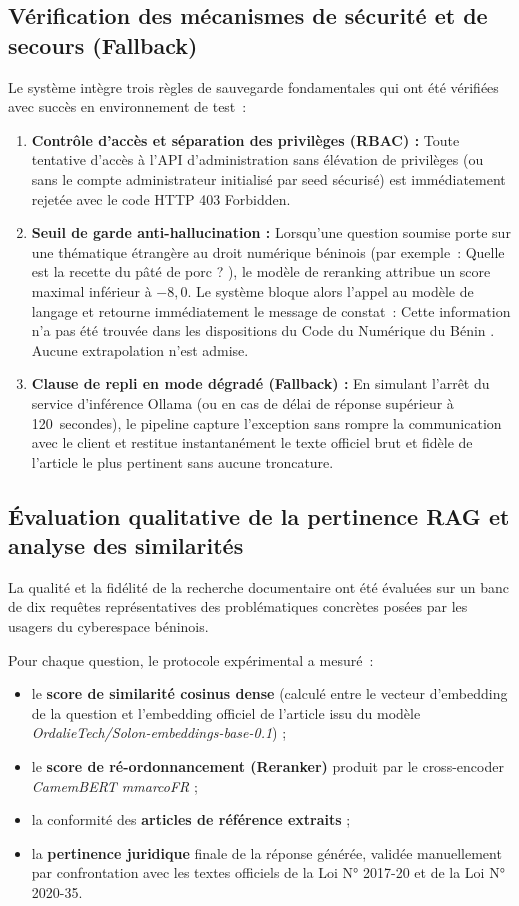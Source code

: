 \subsection{Vérification des mécanismes de sécurité et de secours (Fallback)}

Le système intègre trois règles de sauvegarde fondamentales qui ont été vérifiées avec succès en environnement de test~:
\begin{enumerate}
    \item \textbf{Contrôle d'accès et séparation des privilèges (RBAC) :} Toute tentative d'accès à l'API d'administration sans élévation de privilèges (ou sans le compte administrateur initialisé par seed sécurisé) est immédiatement rejetée avec le code HTTP 403 Forbidden.
    \item \textbf{Seuil de garde anti-hallucination :} Lorsqu'une question soumise porte sur une thématique étrangère au droit numérique béninois (par exemple~: \og Quelle est la recette du pâté de porc ? \fg{}), le modèle de reranking attribue un score maximal inférieur à $-8{,}0$. Le système bloque alors l'appel au modèle de langage et retourne immédiatement le message de constat~: \og Cette information n'a pas été trouvée dans les dispositions du Code du Numérique du Bénin \fg{}. Aucune extrapolation n'est admise.
    \item \textbf{Clause de repli en mode dégradé (Fallback) :} En simulant l'arrêt du service d'inférence Ollama (ou en cas de délai de réponse supérieur à 120~secondes), le pipeline capture l'exception sans rompre la communication avec le client et restitue instantanément le texte officiel brut et fidèle de l'article le plus pertinent sans aucune troncature.
\end{enumerate}

\subsection{Évaluation qualitative de la pertinence RAG et analyse des similarités}

La qualité et la fidélité de la recherche documentaire ont été évaluées sur un banc de dix requêtes représentatives des problématiques concrètes posées par les usagers du cyberespace béninois. 

Pour chaque question, le protocole expérimental a mesuré~:
\begin{itemize}
    \item le \textbf{score de similarité cosinus dense} (calculé entre le vecteur d'embedding de la question et l'embedding officiel de l'article issu du modèle \textit{OrdalieTech/Solon-embeddings-base-0.1}) ;
    \item le \textbf{score de ré-ordonnancement (Reranker)} produit par le cross-encoder \textit{CamemBERT mmarcoFR} ;
    \item la conformité des \textbf{articles de référence extraits} ;
    \item la \textbf{pertinence juridique} finale de la réponse générée, validée manuellement par confrontation avec les textes officiels de la Loi N° 2017-20 et de la Loi N° 2020-35.
\end{itemize}

